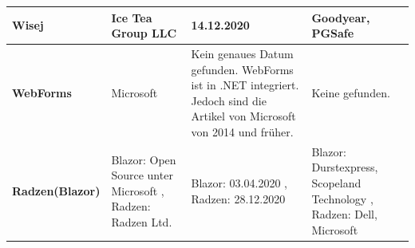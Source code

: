 \documentclass[ngerman]{article}
\begin{document}
\begin{tabularx}{1.15\textwidth}{|l|X|X|X|}
        \hline
        \textbf{Wisej}&Ice Tea Group LLC \cite{WisejDeveloper}&14.12.2020 \cite{WisejReleases}&Goodyear, PGSafe \cite{WisejCompanies}\\
        \hline
        \textbf{WebForms}&Microsoft \cite{WisejDeveloper}&Kein genaues Datum gefunden. WebForms ist in .NET integriert. Jedoch sind die Artikel von Microsoft von 2014 und früher. \cite{WebFormsReleases}&Keine gefunden.\\
        \hline
        \textbf{Radzen(Blazor)}&Blazor: Open Source unter Microsoft \cite{BlazorDeveloper}, Radzen: Radzen Ltd. \cite{RadzenCompanies}&Blazor: 03.04.2020 \cite{BlazorReleases}, Radzen: 28.12.2020 \cite{RadzenReleases}&Blazor: Durstexpress, Scopeland Technology \cite{BlazorCompanies}, Radzen: Dell, Microsoft\\
        \hline
    \end{tabularx}
    \newpage\noindent
\end{document}

